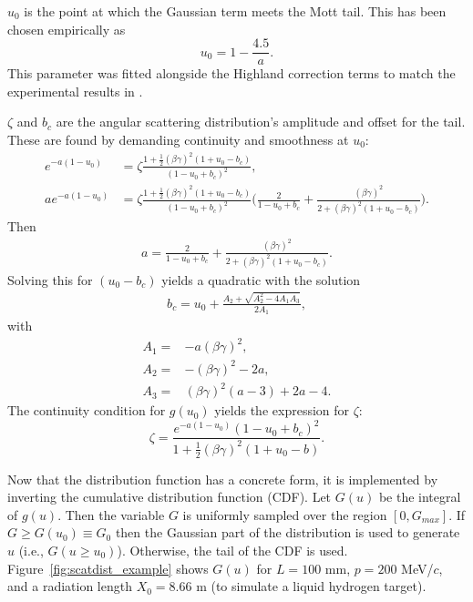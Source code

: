 $u_0$ is the point at which the Gaussian term meets the Mott tail. This has been chosen empirically as
\begin{equation}\label{eqn:cosyu0}
u_0=1-\frac{4.5}{a}.
\end{equation}
This parameter was fitted alongside the Highland correction terms to match the experimental results in \cite{muscat}.

$\zeta$ and $b_c$ are the angular scattering distribution's amplitude and offset for the tail. These are found by demanding continuity and smoothness at $u_0$:
\begin{align*}
e^{-a(1-u_0)}&=\zeta\frac{1+\frac{1}{2}(\beta\gamma)^2(1+u_0-b_c)}{(1-u_0+b_c)^2},\\
ae^{-a(1-u_0)}&=\zeta\frac{1+\frac{1}{2}(\beta\gamma)^2(1+u_0-b_c)}{(1-u_0+b_c)^2} \Big(\frac{2}{1-u_0+b_c}+\frac{(\beta\gamma)^2}{2+(\beta\gamma)^2(1+u_0-b_c)}\Big).
\end{align*}
Then
\begin{align*}
a=\frac{2}{1-u_0+b_c}+\frac{(\beta\gamma)^2}{2+(\beta\gamma)^2(1+u_0-b_c)}.
\end{align*}
Solving this for $(u_0-b_c)$ yields a quadratic with the solution
\begin{align} \label{eqn:cosybc}
b_c=u_0+\frac{A_2 + \sqrt{A_2 ^2 - 4A_1 A_3}}{2A_1},
\end{align}
with
\begin{align*}
A_1=&-a(\beta\gamma)^2,\\
A_2=&-(\beta\gamma)^2-2a,\\
A_3=&(\beta\gamma)^2(a-3)+2a-4.
\end{align*}
The continuity condition for $g(u_0)$ yields the expression for $\zeta$:
\begin{equation}\label{eqn:cosyzeta}
\zeta=\frac{e^{-a(1-u_0)}(1-u_0+b_c)^2}{1+\frac{1}{2}(\beta\gamma)^2(1+u_0-b)}.
\end{equation}

Now that the distribution function has a concrete form, it is implemented by inverting the cumulative distribution function (CDF).  Let $G(u)$ be the integral of $g(u)$. Then the variable $G$ is uniformly sampled over the region $[0,G_{max}]$. If $G\geq G(u_0) \equiv G_0$ then the Gaussian part of the distribution is used to generate $u$ (i.e., $G(u\geq u_0)$). Otherwise, the tail of the CDF is used. Figure~\ref{fig:scatdist_example} shows $G(u)$ for $L=100$ mm, $p=200$ MeV/$c$, and a radiation length $X_0 = 8.66$ m (to simulate a liquid hydrogen target).


